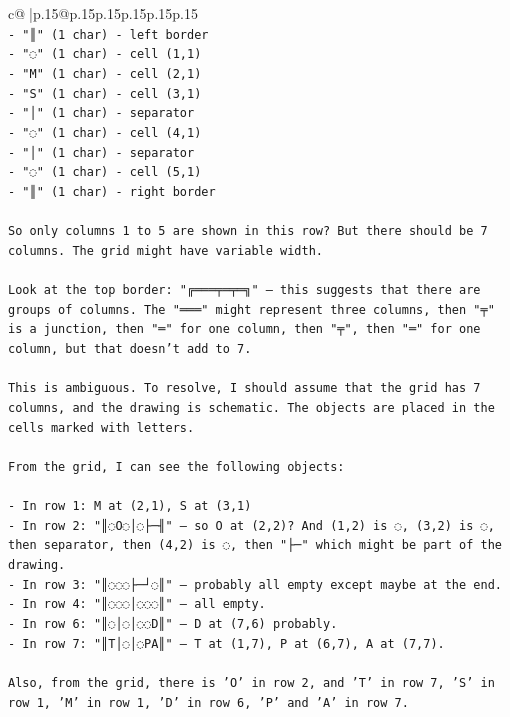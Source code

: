 \documentclass{article}
\begin{document}
{\begin{supertabular}{c@{$\;$}|p{.15\linewidth}@{}p{.15\linewidth}p{.15\linewidth}p{.15\linewidth}p{.15\linewidth}p{.15\linewidth}}
{{{\\ 
\texttt{{-} "║" (1 char) {-} left border} \\
\texttt{{-} "◌" (1 char) {-} cell (1,1)} \\
\texttt{{-} "M" (1 char) {-} cell (2,1)} \\
\texttt{{-} "S" (1 char) {-} cell (3,1)} \\
\texttt{{-} "│" (1 char) {-} separator} \\
\texttt{{-} "◌" (1 char) {-} cell (4,1)} \\
\texttt{{-} "│" (1 char) {-} separator} \\
\texttt{{-} "◌" (1 char) {-} cell (5,1)} \\
\texttt{{-} "║" (1 char) {-} right border} \\
\\ 
\texttt{So only columns 1 to 5 are shown in this row? But there should be 7 columns. The grid might have variable width.} \\
\\ 
\texttt{Look at the top border: "╔═══╤═╤═╗" — this suggests that there are groups of columns. The "═══" might represent three columns, then "╤" is a junction, then "═" for one column, then "╤", then "═" for one column, but that doesn't add to 7.} \\
\\ 
\texttt{This is ambiguous. To resolve, I should assume that the grid has 7 columns, and the drawing is schematic. The objects are placed in the cells marked with letters.} \\
\\ 
\texttt{From the grid, I can see the following objects:} \\
\\ 
\texttt{{-} In row 1: M at (2,1), S at (3,1)} \\
\texttt{{-} In row 2: "║◌O◌│◌├─╢" — so O at (2,2)? And (1,2) is ◌, (3,2) is ◌, then separator, then (4,2) is ◌, then "├─" which might be part of the drawing.} \\
\texttt{{-} In row 3: "║◌◌◌├─┘◌║" — probably all empty except maybe at the end.} \\
\texttt{{-} In row 4: "║◌◌◌│◌◌◌║" — all empty.} \\
\texttt{{-} In row 6: "║◌│◌│◌◌D║" — D at (7,6) probably.} \\
\texttt{{-} In row 7: "║T│◌│◌PA║" — T at (1,7), P at (6,7), A at (7,7).} \\
\\ 
\texttt{Also, from the grid, there is 'O' in row 2, and 'T' in row 7, 'S' in row 1, 'M' in row 1, 'D' in row 6, 'P' and 'A' in row 7.} \\
}}}
\end{supertabular}}
\end{document}
